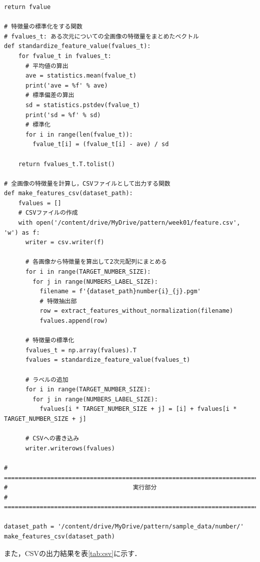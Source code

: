\documentclass{jlreq}
\numberwithin{equation}{section}
\begin{document}
\begin{lstlisting}[caption={特徴抽出の実装}, label=src:extract]
    return fvalue

# 特徴量の標準化をする関数
# fvalues_t: ある次元についての全画像の特徴量をまとめたベクトル
def standardize_feature_value(fvalues_t):
    for fvalue_t in fvalues_t:
      # 平均値の算出
      ave = statistics.mean(fvalue_t)
      print('ave = %f' % ave)
      # 標準偏差の算出
      sd = statistics.pstdev(fvalue_t)
      print('sd = %f' % sd)
      # 標準化
      for i in range(len(fvalue_t)):
        fvalue_t[i] = (fvalue_t[i] - ave) / sd

    return fvalues_t.T.tolist()

# 全画像の特徴量を計算し，CSVファイルとして出力する関数
def make_features_csv(dataset_path):
    fvalues = []
    # CSVファイルの作成
    with open('/content/drive/MyDrive/pattern/week01/feature.csv', 'w') as f:
      writer = csv.writer(f)

      # 各画像から特徴量を算出して2次元配列にまとめる
      for i in range(TARGET_NUMBER_SIZE):
        for j in range(NUMBERS_LABEL_SIZE):
          filename = f'{dataset_path}number{i}_{j}.pgm'
          # 特徴抽出部
          row = extract_features_without_normalization(filename)
          fvalues.append(row)

      # 特徴量の標準化
      fvalues_t = np.array(fvalues).T
      fvalues = standardize_feature_value(fvalues_t)

      # ラベルの追加
      for i in range(TARGET_NUMBER_SIZE):
        for j in range(NUMBERS_LABEL_SIZE):
          fvalues[i * TARGET_NUMBER_SIZE + j] = [i] + fvalues[i * TARGET_NUMBER_SIZE + j]

      # CSVへの書き込み
      writer.writerows(fvalues)

# ==============================================================================
#                                   実行部分
# ==============================================================================

dataset_path = '/content/drive/MyDrive/pattern/sample_data/number/'
make_features_csv(dataset_path)
\end{lstlisting}

また，CSVの出力結果を表\ref{tab:csv}に示す．
\end{document}
